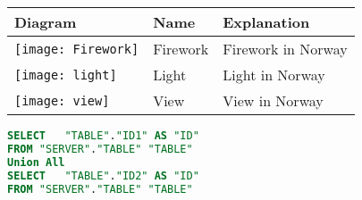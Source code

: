   \begin{tabular}{|m{}|m{}|m{}|}
  \hline
  Diagram & Name & Explanation \\
  \hline
\begin{minipage}{.2\textwidth}
      \texttt{[image: Firework]}
    \end{minipage}
    
 & Firework & Firework in Norway \\
 
  \hline
\begin{minipage}{.2\textwidth}
      \texttt{[image: light]}
    \end{minipage}
    
 & Light & Light in Norway \\

  \hline
     \begin{minipage}{.2\textwidth}
      \texttt{[image: view]}
    \end{minipage}
    
 & View & View in Norway
 \\
  \hline
    
\end{tabular}

\begin{lstlisting}[language=SQL, caption=SQL Script]
SELECT   "TABLE"."ID1" AS "ID"
FROM "SERVER"."TABLE" "TABLE"
Union All
SELECT   "TABLE"."ID2" AS "ID"
FROM "SERVER"."TABLE" "TABLE"

\end{lstlisting}